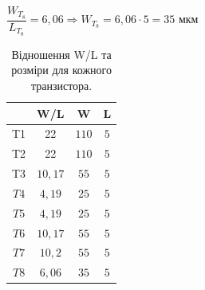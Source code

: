 \documentclass[a4paper,14pt]{extreport}
\begin{document}

$ \dfrac{W_{T_{8}}}{L_{T_{8}}} =6,06 \Rightarrow {W_{T_{8}}} = 6,06 \cdot 5 = 35 $ мкм






\begin{table}[h!]
\begin{center}
\caption{Відношення W/L та розміри для кожного транзистора.}
\begin{tabular}{|c|c|c|c|}

\hline             & W/L         & W           & L \\
\hline   T1        & 22          & $1 1 0$     & $5$ \\
\hline   T2        & 22          & $1 1 0$     & $5$ \\
\hline   T3        & $10,17$     & $55$       & $5$ \\
\hline   $T4$      & $4,19$      & $25$       & $5$ \\
\hline   $T5$      & $4,19$      & $25$       & $5$ \\
\hline   $T6$      & $10,17$     & $55$       & $5$ \\
\hline   $T7$      & $10,2$      & $55$         & $5$ \\
\hline   $T8$      & $6,06$      & $3 5$       & $5$ \\
\hline
\end{tabular}
\end{center}
\end{table}
\end{document}
